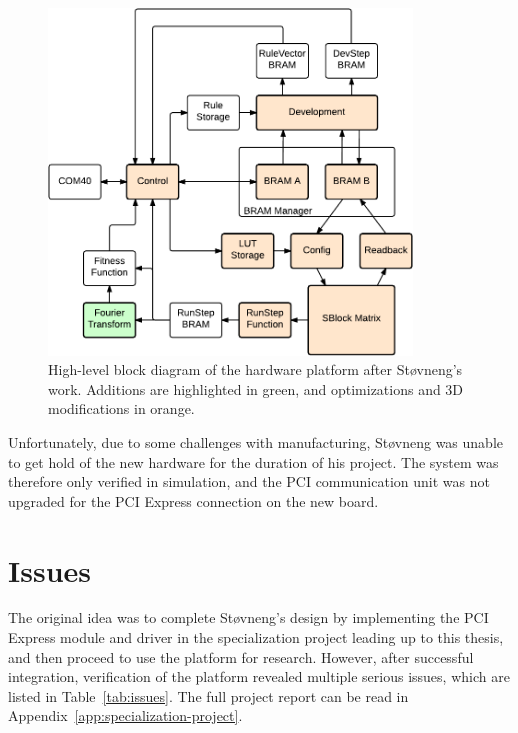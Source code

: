 \begin{figure}[!ht]
    \centering
    \includegraphics[width=0.86\textwidth]{figures/overview-stovneng}
    \caption[Støvneng's hardware design.]{
        High-level block diagram of the hardware platform after Støvneng's work.
        Additions are highlighted in green, and optimizations and 3D modifications in orange.
    }
    \label{fig:overview-stovneng}
\end{figure}

Unfortunately, due to some challenges with manufacturing, Støvneng was unable to get hold of the new hardware for the duration of his project.
The system was therefore only verified in simulation, and the PCI communication unit was not upgraded for the PCI Express connection on the new board.


\section{Issues}


The original idea was to complete Støvneng's design by implementing the PCI Express module and driver in the specialization project leading up to this thesis, and then proceed to use the platform for research.
However, after successful integration, verification of the platform revealed multiple serious issues, which are listed in Table~\ref{tab:issues}.
The full project report can be read in Appendix~\ref{app:specialization-project}.

